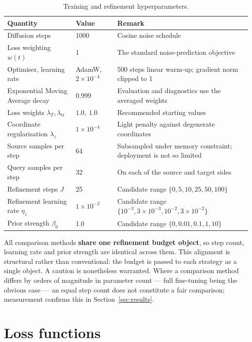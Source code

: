 \documentclass[11pt]{article}
\begin{document}
\begin{table}[htbp]
\centering\small
\begin{tabular}{@{}p{5.4cm}p{3.2cm}p{5.4cm}@{}}
\toprule
\textbf{Quantity} & \textbf{Value} & \textbf{Remark} \\
\midrule
Diffusion steps & 1000 & Cosine noise schedule \\
Loss weighting $w(t)$ & 1 & The standard noise-prediction objective \\
Optimiser, learning rate & AdamW, $2\times10^{-4}$ & 500 steps linear warm-up; gradient norm clipped to 1 \\
Exponential Moving Average decay & 0.999 & Evaluation and diagnostics use the averaged weights \\
Loss weights $\lambda_T,\lambda_{\mathrm{tr}}$ & $1.0,\ 1.0$ & Recommended starting values \\
Coordinate regularisation $\lambda_z$ & $1\times10^{-4}$ & Light penalty against degenerate coordinates \\
Source samples per step & 64 & Subsampled under memory constraint; deployment is not so limited \\
Query samples per step & 32 & On each of the source and target sides \\
Refinement steps $J$ & 25 & Candidate range $\{0,5,10,25,50,100\}$ \\
Refinement learning rate $\eta_z$ & $1\times10^{-2}$ & Candidate range $\{10^{-3},3\!\times\!10^{-3},10^{-2},3\!\times\!10^{-2}\}$ \\
Prior strength $\beta_0$ & 1.0 & Candidate range $\{0,0.01,0.1,1,10\}$ \\
\bottomrule
\end{tabular}
\caption{Training and refinement hyperparameters.}
\label{tab:hp}
\end{table}

All comparison methods \textbf{share one refinement budget object}, so step count, learning rate and
prior strength are identical across them. This alignment is structural rather than conventional: the
budget is passed to each strategy as a single object. A caution is nonetheless warranted. Where a
comparison method differs by orders of magnitude in parameter count --- full fine-tuning being the
obvious case --- an equal step count does not constitute a fair comparison; measurement confirms this
in Section~\ref{sec:results}.

\section{Loss functions}
\label{sec:loss}
\end{document}
